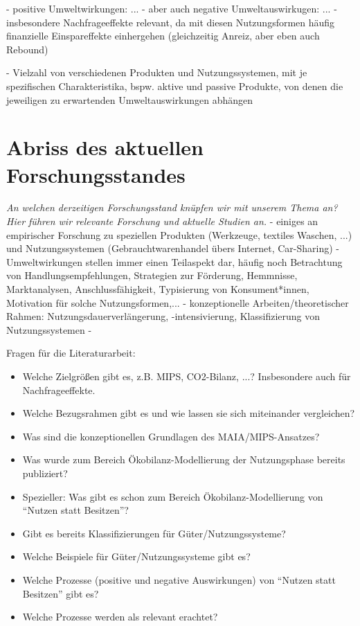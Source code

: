 \documentclass[11pt, titlepage=true]{scrartcl} %
\newcommand{\was}[1]{\small\textit{#1}}
\begin{document}
- positive Umweltwirkungen: ...
- aber auch negative Umweltauswirkugen: ...
- insbesondere Nachfrageeffekte relevant, da mit diesen Nutzungsformen häufig finanzielle Einspareffekte einhergehen (gleichzeitig Anreiz, aber eben auch Rebound)

- Vielzahl von verschiedenen Produkten und Nutzungssystemen, mit je spezifischen Charakteristika, bspw. aktive und passive Produkte, von denen die jeweiligen zu erwartenden Umweltauswirkungen abhängen

\section{Abriss des aktuellen Forschungsstandes}
\was{An welchen derzeitigen Forschungsstand knüpfen wir mit unserem Thema an? Hier führen wir relevante Forschung und aktuelle Studien an.}
- einiges an empirischer Forschung zu speziellen Produkten (Werkzeuge, textiles Waschen, ...) und Nutzungssystemen (Gebrauchtwarenhandel übers Internet, Car-Sharing)
- Umweltwirkungen stellen immer einen Teilaspekt dar, häufig noch Betrachtung von Handlungsempfehlungen, Strategien zur Förderung, Hemmnisse, Marktanalysen, Anschlussfähigkeit, Typisierung von Konsument*innen, Motivation für solche Nutzungsformen,...
- konzeptionelle Arbeiten/theoretischer Rahmen: Nutzungsdauerverlängerung, -intensivierung, Klassifizierung von Nutzungssystemen
- 


Fragen für die Literaturarbeit:
\begin{itemize}
	\item Welche Zielgrößen gibt es, z.B. MIPS, CO2-Bilanz, ...? Insbesondere auch für Nachfrageeffekte.
	\item Welche Bezugsrahmen gibt es und wie lassen sie sich miteinander vergleichen?
	\item Was sind die konzeptionellen Grundlagen des MAIA/MIPS-Ansatzes?
	
	\item Was wurde zum Bereich Ökobilanz-Modellierung der Nutzungsphase bereits publiziert?
	\item Spezieller: Was gibt es schon zum Bereich Ökobilanz-Modellierung von \enquote{Nutzen statt Besitzen}?
	
	\item Gibt es bereits Klassifizierungen für Güter/Nutzungssysteme?
	\item Welche Beispiele für Güter/Nutzungssysteme gibt es?
	
	\item Welche Prozesse (positive und negative Auswirkungen) von \enquote{Nutzen statt Besitzen} gibt es?
	\item Welche Prozesse werden als relevant erachtet?
\end{itemize}
\end{document}
